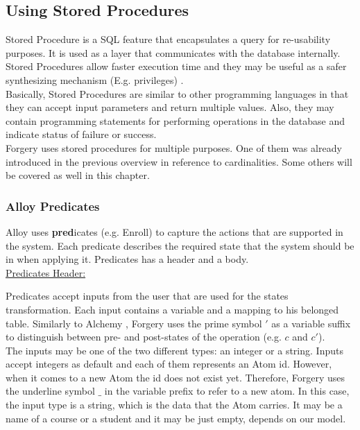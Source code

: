 \documentclass[oneside]{book}
\begin{document}
\newpage
\subsection{Using Stored Procedures}

\noindent Stored Procedure is a SQL feature that encapsulates a query for re-usability purposes. It is used as a layer that communicates with the database internally. Stored Procedures allow faster execution time and they may be useful as a safer synthesizing mechanism (E.g. privileges) \cite{when}.\\

\noindent Basically, Stored Procedures are similar to other programming languages in that they can accept input parameters and return multiple values. Also, they may contain programming statements for performing operations in the database and indicate status of failure or success.\\

\noindent Forgery uses stored procedures for multiple purposes. One of them was already introduced in the previous overview in reference to cardinalities. Some others will be covered as well in this chapter.\\

\subsubsection{Alloy Predicates}

\noindent Alloy uses \textbf{pred}icates (e.g. Enroll) to capture the actions that are supported in the system. Each predicate describes the required state that the system should be in when applying it. Predicates has a header and a body. \\

\noindent\underline{Predicates Header:}

\noindent Predicates accept inputs from the user that are used for the states transformation. Each input contains a variable and a mapping to his belonged table. Similarly to Alchemy \cite{alchemy}, Forgery uses the prime symbol $'$ as a variable suffix to distinguish between pre- and post-states of the operation (e.g. $c$ and $c'$).\\

\noindent The inputs may be one of the two different types: an integer or a string. Inputs accept integers as default and each of them represents an Atom id. However, when it comes to a new Atom the id does not exist yet. Therefore, Forgery uses the underline symbol $\_$ in the variable prefix to refer to a new atom. In this case, the input type is a string, which is the data that the Atom carries. It may be a name of a course or a student and it may be just empty, depends on our model.\\
\end{document}
